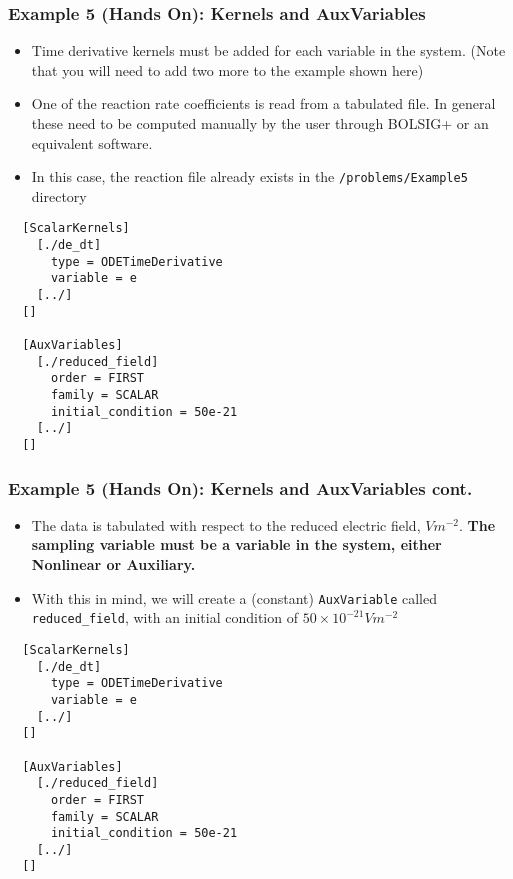 \begin{frame}[fragile]
	\frametitle{Example 5 (Hands On): Kernels and AuxVariables}
	\begin{minipage}{0.6\linewidth}
	\begin{itemize}
		\item Time derivative kernels must be added for each variable in the system. (Note that you will need to add two more to the example shown here) 
		\item One of the reaction rate coefficients is read from a tabulated file. In general these need to be computed manually by the user through BOLSIG+ or an equivalent software. 
		\item In this case, the reaction file already exists in the \texttt{/problems/Example5} directory
	\end{itemize}
	\end{minipage}%
	\begin{minipage}{0.4\linewidth}
	\begin{scriptsize}
	\begin{BVerbatim}
  [ScalarKernels]
    [./de_dt]
      type = ODETimeDerivative
      variable = e
    [../]
  []

  [AuxVariables]
    [./reduced_field]
      order = FIRST
      family = SCALAR
      initial_condition = 50e-21
    [../]
  []
	\end{BVerbatim}
	\end{scriptsize}
	
	\end{minipage}
\end{frame}

\begin{frame}[fragile]
	\frametitle{Example 5 (Hands On): Kernels and AuxVariables cont.}
	\begin{minipage}{0.6\linewidth}
	\begin{itemize}
		\item The data is tabulated with respect to the reduced electric field, $V m^{-2}$. \textbf{The sampling variable must be a variable in the system, either Nonlinear or Auxiliary.}
		\item With this in mind, we will create a (constant) \texttt{AuxVariable} called \texttt{reduced\_field}, with an initial condition of $50 \times 10^{-21} V m^{-2}$
	\end{itemize}
	\end{minipage}%
	\begin{minipage}{0.4\linewidth}
	\begin{scriptsize}
	\begin{BVerbatim}
  [ScalarKernels]
    [./de_dt]
      type = ODETimeDerivative
      variable = e
    [../]
  []

  [AuxVariables]
    [./reduced_field]
      order = FIRST
      family = SCALAR
      initial_condition = 50e-21
    [../] 
  []  
	\end{BVerbatim}
	\end{scriptsize}
	
	\end{minipage}
\end{frame}

